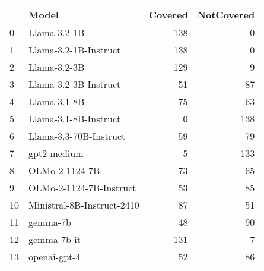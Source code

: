 \begin{tabular}{llrr}
\toprule
 & Model & Covered & NotCovered \\
\midrule
0 & Llama-3.2-1B & 138 & 0 \\
1 & Llama-3.2-1B-Instruct & 138 & 0 \\
2 & Llama-3.2-3B & 129 & 9 \\
3 & Llama-3.2-3B-Instruct & 51 & 87 \\
4 & Llama-3.1-8B & 75 & 63 \\
5 & Llama-3.1-8B-Instruct & 0 & 138 \\
6 & Llama-3.3-70B-Instruct & 59 & 79 \\
7 & gpt2-medium & 5 & 133 \\
8 & OLMo-2-1124-7B & 73 & 65 \\
9 & OLMo-2-1124-7B-Instruct & 53 & 85 \\
10 & Ministral-8B-Instruct-2410 & 87 & 51 \\
11 & gemma-7b & 48 & 90 \\
12 & gemma-7b-it & 131 & 7 \\
13 & openai-gpt-4 & 52 & 86 \\
\bottomrule
\end{tabular}
